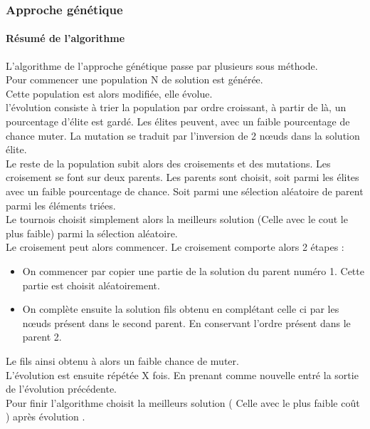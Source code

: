\documentclass[10pt,a4paper]{report}
\begin{document}
	\subsubsection{Approche génétique}
		\paragraph{Résumé de l'algorithme\\}
		L'algorithme de l'approche génétique passe par plusieurs sous méthode. \\
		Pour commencer une population N de solution est générée. \\
		Cette population est alors modifiée, elle évolue. \\
		l'évolution consiste à trier la population par ordre croissant, à partir de là, un pourcentage d'élite est gardé. Les élites peuvent, avec un faible pourcentage de chance muter. La mutation se traduit par l'inversion de 2 nœuds dans la solution élite. \\
		Le reste de la population subit alors des croisements et des mutations. Les croisement se font sur deux parents. Les parents sont choisit, soit parmi les élites avec un faible pourcentage de chance. Soit parmi une sélection aléatoire de parent parmi les éléments triées. \\
		Le tournois choisit simplement alors la meilleurs solution (Celle avec le cout le plus faible) parmi la sélection aléatoire. \\
		
		Le croisement peut alors commencer. Le croisement comporte alors 2 étapes :
		\begin{itemize}
			\item On commencer par copier une partie de la solution du parent numéro 1. Cette partie est choisit aléatoirement.
			\item On complète ensuite la solution fils obtenu en complétant celle ci par les nœuds présent dans le second parent. En conservant l'ordre présent dans le parent 2.
		\end{itemize}
		Le fils ainsi obtenu à alors un faible chance de muter. \\
		
		L'évolution est ensuite répétée X fois. En prenant comme nouvelle entré la sortie de l'évolution précédente. \\
		Pour finir l'algorithme choisit la meilleurs solution ( Celle avec le plus faible coût ) après évolution . \\
		
\end{document}
